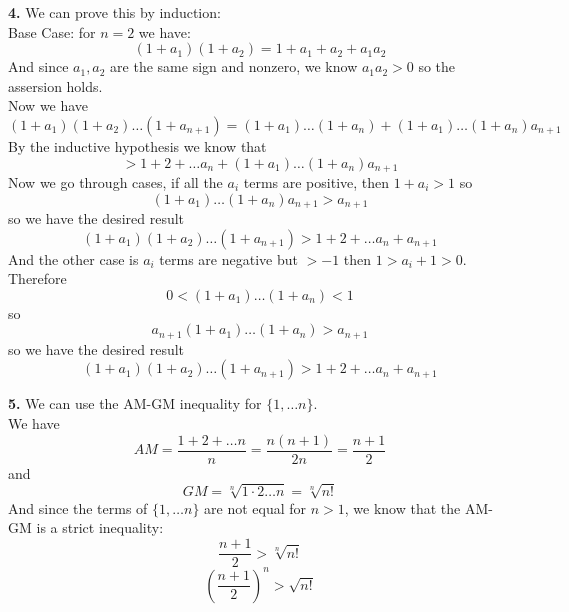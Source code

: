 \documentclass[12pt]{article}
\newenvironment{ques}{\vspace{2 ex}}{\vspace{2 ex}}
\theoremstyle{definition}
\begin{document}
\begin{ques}
	\textbf{4.} 
		We can prove this by induction:\\
		Base Case: for $n = 2$ we have:
		$$(1 + a_1)(1 + a_2) = 1 + a_1 + a_2 + a_1a_2$$
		And since $a_1, a_2$ are the same sign and nonzero, we know $a_1a_2 > 0$ so
		the assersion holds.\\
		Now we have 
		$$(1 + a_1)(1+ a_2) \dots (1 + a_{n+1}) = (1 + a_1) \dots (1 +
		a_n) + (1 + a_1) \dots (1 + a_n)a_{n+1}$$
		By the inductive hypothesis we know that
		$$> 1 + 2 + \dots a_n + (1 + a_1) \dots (1 + a_n)a_{n+1}$$
		Now we go through cases, if all the $a_i$ terms are positive,
		then $1 + a_i > 1$ so 
		$$(1 + a_1) \dots (1 + a_n)a_{n+1} > a_{n+1}$$
		so we have the desired result
		$$(1 + a_1)(1+ a_2) \dots (1 + a_{n+1})> 1 + 2 + \dots a_n + a_{n+1}$$
		And the other case is $a_i$ terms are negative but  $> -1$ then
		$1 > a_i + 1 > 0$. Therefore 
		$$0 < (1 + a_1) \dots (1 + a_n) < 1$$
		so 
		$$a_{n+1}(1 + a_1) \dots (1 + a_n) > a_{n+1}$$
		so we have the desired result
		$$(1 + a_1)(1+ a_2) \dots (1 + a_{n+1})> 1 + 2 + \dots a_n + a_{n+1}$$
		
\end{ques}

\begin{ques}
	\textbf{5.} 
		We can use the AM-GM inequality for $\{1, \dots n\}$.\\
		We have
		$$AM = \frac{1 + 2 + \dots n}n = \frac{n(n+1)}{2n}= \frac{n+1}{2}$$
		and
		$$GM = \sqrt[n]{1 \cdot 2 \dots n} = \sqrt[n]{n!}$$
		And since the terms of $\{1, \dots n\}$ are not equal for $n >
		1$, we know that the AM-GM is a strict inequality:
		$$\frac{n+1}{2} > \sqrt[n]{n!}$$
		$$\left(\frac{n+1}{2}\right)^n > \sqrt{n!}$$
\end{ques}
\end{document}
